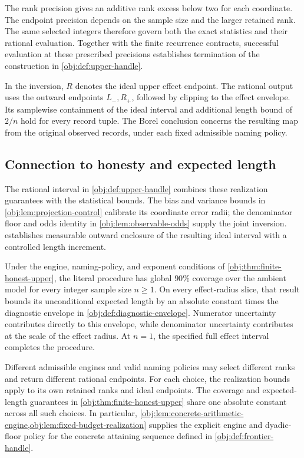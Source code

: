 The rank precision  gives an additive rank excess below two for each coordinate. The endpoint precision  depends on the sample size and the larger retained rank. The same selected integers therefore govern both the exact statistics and their rational evaluation. Together with the finite recurrence contracts, successful evaluation at these prescribed precisions establishes termination of the construction in \cref{obj:def:upper-handle}.

In the inversion, \(R\) denotes the ideal upper effect endpoint. The rational output uses the outward endpoints \(L_-,R_+\), followed by clipping to the effect envelope. Its samplewise containment of the ideal interval and additional length bound of \(2/n\) hold for every record tuple. The Borel conclusion concerns the resulting map from the original observed records, under each fixed admissible naming policy.

\subsection{Connection to honesty and expected length}

The rational interval  in \cref{obj:def:upper-handle} combines these realization guarantees with the statistical bounds. The bias and variance bounds in \cref{obj:lem:projection-control} calibrate its coordinate error radii; the denominator floor and odds identity in \cref{obj:lem:observable-odds} supply the joint inversion.  establishes measurable outward enclosure of the resulting ideal interval with a controlled length increment.

Under the engine, naming-policy, and exponent conditions of \cref{obj:thm:finite-honest-upper}, the literal procedure has global \(90\%\) coverage over the ambient model for every integer sample size \(n\ge1\). On every effect-radius slice, that result bounds its unconditional expected length by an absolute constant times the diagnostic envelope in \cref{obj:def:diagnostic-envelope}. Numerator uncertainty contributes directly to this envelope, while denominator uncertainty contributes at the scale of the effect radius. At \(n=1\), the specified full effect interval completes the procedure.

Different admissible engines and valid naming policies may select different ranks and return different rational endpoints. For each choice, the realization bounds apply to its own retained ranks and ideal endpoints. The coverage and expected-length guarantees in \cref{obj:thm:finite-honest-upper} share one absolute constant across all such choices. In particular, \cref{obj:lem:concrete-arithmetic-engine,obj:lem:fixed-budget-realization} supplies the explicit engine and dyadic-floor policy for the concrete attaining sequence defined in \cref{obj:def:frontier-handle}.
